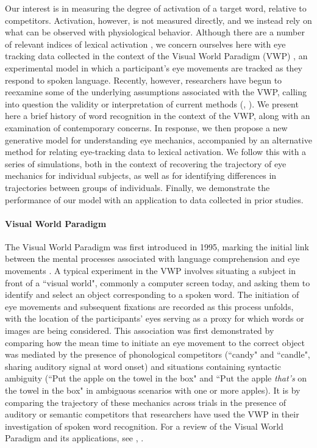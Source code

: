 \documentclass{article}
\begin{document}
Our interest is in measuring the degree of activation of a target word, relative to competitors. Activation, however, is not measured directly, and we instead rely on what can be observed with physiological behavior. Although there are a number of relevant indices of lexical activation \citep{Spivey2005}, we concern ourselves here with eye tracking data collected in the context of the Visual World Paradigm (VWP) \citep{tanenhaus1995integration}, an experimental model in which a participant's eye movements are tracked as they respond to spoken language. Recently, however, researchers have begun to reexamine some of the underlying assumptions associated with the VWP, calling into question the validity or interpretation of current methods (\citep{Magnuson2019}, \citep{mcmurray2022m}). We present here a brief history of word recognition in the context of the VWP, along with an examination of contemporary concerns. In response, we then propose a new generative model for understanding eye mechanics, accompanied by an alternative method for relating eye-tracking data to lexical activation. We follow this with a series of simulations, both in the context of recovering the trajectory of eye mechanics for individual subjects, as well as for identifying differences in trajectories between groups of individuals. Finally, we demonstrate the performance of our model with an application to data collected in prior studies. 


\paragraph{Visual World Paradigm} The Visual World Paradigm  was first introduced in 1995, marking the initial link between the mental processes associated with language comprehension and eye movements \citep{tanenhaus1995integration}. A typical experiment in the VWP involves situating a subject in front of a ``visual world", commonly a computer screen today, and asking them to identify and select an object corresponding to a spoken word. The initiation of eye movements and subsequent fixations are recorded as this process unfolds, with the location of the participants' eyes serving as a proxy for which words or images are being considered. This association was first demonstrated by comparing how the mean time to initiate an eye movement to the correct object was mediated by the presence of phonological competitors (``candy" and ``candle", sharing auditory signal at word onset) and situations containing syntactic ambiguity (``Put the apple on the towel in the box" and ``Put the apple \textit{that's} on the towel in the box" in ambiguous scenarios with one or more apples). It is by comparing the trajectory of these mechanics across trials in the presence of auditory or semantic competitors that researchers have used the VWP in their investigation of spoken word recognition. For a review of the Visual World Paradigm and its applications, see \citet{Huettig2011}, \citet{salverda2017visual}.
\end{document}

